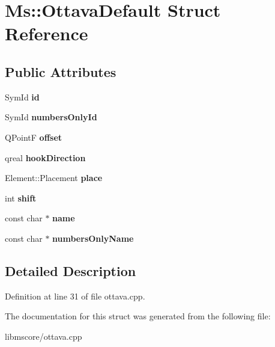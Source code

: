 \hypertarget{struct_ms_1_1_ottava_default}{}\section{Ms\+:\+:Ottava\+Default Struct Reference}
\label{struct_ms_1_1_ottava_default}
\subsection*{Public Attributes}
\begin{DoxyCompactItemize}
\item 
\mbox{\label{struct_ms_1_1_ottava_default_a7c7a2858575f786beb9aa0ce33fdc49b}} 
Sym\+Id {\bfseries id}
\item 
\mbox{\label{struct_ms_1_1_ottava_default_ac68ec187535aaff896b5275f9cb37c8d}} 
Sym\+Id {\bfseries numbers\+Only\+Id}
\item 
\mbox{\label{struct_ms_1_1_ottava_default_ae74b749a9e6bb53a500ff96b884cba57}} 
Q\+PointF {\bfseries offset}
\item 
\mbox{\label{struct_ms_1_1_ottava_default_aa9e1499c56c0bc864fe622a750092363}} 
qreal {\bfseries hook\+Direction}
\item 
\mbox{\label{struct_ms_1_1_ottava_default_ad2e19a057867c29bb8b76a3f10836e83}} 
Element\+::\+Placement {\bfseries place}
\item 
\mbox{\label{struct_ms_1_1_ottava_default_a34c6e136c1aa17b5eef11770ecc3d772}} 
int {\bfseries shift}
\item 
\mbox{\label{struct_ms_1_1_ottava_default_a5bf90b7b1d4f398f363d644494672255}} 
const char $\ast$ {\bfseries name}
\item 
\mbox{\label{struct_ms_1_1_ottava_default_a18cd43bd9b6c5ef39e895740b0cf279a}} 
const char $\ast$ {\bfseries numbers\+Only\+Name}
\end{DoxyCompactItemize}


\subsection{Detailed Description}


Definition at line 31 of file ottava.\+cpp.



The documentation for this struct was generated from the following file\+:\begin{DoxyCompactItemize}
\item 
libmscore/ottava.\+cpp\end{DoxyCompactItemize}
